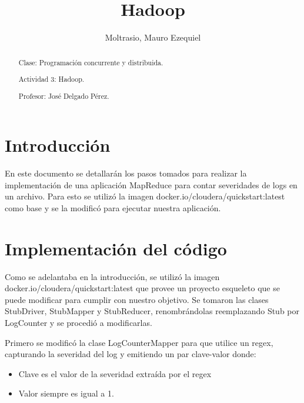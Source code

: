 \documentclass[a4paper]{article}
\begin{document}
\title{Hadoop}
\author{Moltrasio, Mauro Ezequiel}
\date{}
\renewcommand{\abstractname}{\vspace{-\baselineskip}}

\begin{titlingpage}
    \maketitle
    \begin{abstract}

        Clase: Programación concurrente y distribuida.

        Actividad 3: Hadoop.

        Profesor: José Delgado Pérez.
    \end{abstract}
\end{titlingpage}

\maketitle
\tableofcontents

\section{Introducción}

En este documento se detallarán los pasos tomados para realizar la
implementación de una aplicación MapReduce para contar severidades de logs en
un archivo. Para esto se utilizó la imagen docker.io/cloudera/quickstart:latest
como base y se la modificó para ejecutar nuestra aplicación.

\section{Implementación del código}

Como se adelantaba en la introducción, se utilizó la imagen
docker.io/cloudera/quickstart:latest que provee un proyecto esqueleto que se
puede modificar para cumplir con nuestro objetivo. Se tomaron las clases
StubDriver, StubMapper y StubReducer, renombrándolas reemplazando Stub por
LogCounter y se procedió a modificarlas.

Primero se modificó la clase LogCounterMapper para que utilice un regex,
capturando la severidad del log y emitiendo un par clave-valor donde:

\begin{itemize}
    \item Clave es el valor de la severidad extraída por el regex
    \item Valor siempre es igual a 1.
\end{itemize}
\end{document}
